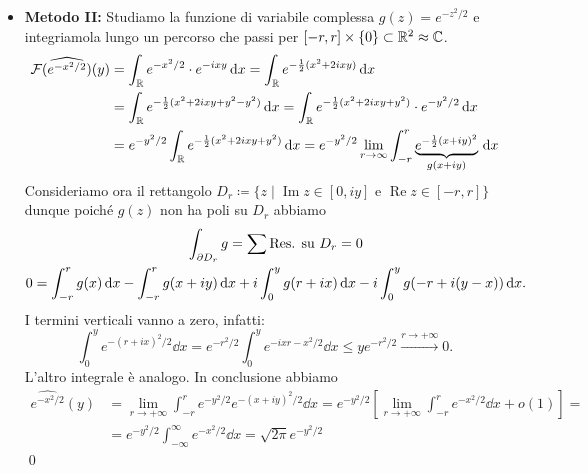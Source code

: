 \begin{itemize}
	\item \textbf{Metodo II:} Studiamo la funzione di variabile complessa $g(z) = e^{-z^2/2}$ e integriamola lungo un percorso che passi per $[-r, r] \times \{ 0 \} \subset \mathbb R^2 \approx \mathbb C$.
		$$
		\begin{aligned}
			\mathcal F(\widehat{e^{-x^2/2}})(y) 
			&= \int_\mathbb R e^{-x^2 / 2} \cdot e^{-ixy} \,\mathrm{d} x
			= \int_\mathbb R e^{-\frac{1}{2}(x^2 + 2ixy)} \,\mathrm{d} x \\
			&= \int_\mathbb R e^{-\frac{1}{2}(x^2 + 2ixy + y^2 - y^2)} \,\mathrm{d} x 
			= \int_\mathbb R e^{-\frac{1}{2}(x^2 + 2ixy + y^2)} \cdot e^{-y^2 / 2} \,\mathrm{d} x \\
			&= e^{-y^2 / 2} \int_\mathbb R e^{-\frac{1}{2}(x^2 + 2ixy + y^2)} \,\mathrm{d} x 
			= e^{-y^2 / 2} \lim_{r \to \infty} \int_{-r}^r \underbrace{e^{-\frac{1}{2}(x + iy)^2}}_{g(x + iy)} \,\mathrm{d} x
		\end{aligned}
		$$
		Consideriamo ora il rettangolo $D_r \coloneqq \{ z \mid \operatorname{Im} z \in [0, iy] \text{ e } \operatorname{Re} z \in [-r, r] \}$ dunque poiché $g(z)$ non ha poli su $D_r$ abbiamo
		$$
		\begin{gathered}
			\int_{\partial D_r} g = \sum \text{Res. su $D_r$} = 0 \\
			0 = \int_{-r}^r g(x) \,\mathrm{d} x - \int_{-r}^r g(x + iy) \,\mathrm{d} x 
			+ i \int_{0}^{y} g(r + ix) \,\mathrm{d} x - i\int_{0}^{y} g(-r + i(y-x)) \,\mathrm{d} x.
		\end{gathered}
		$$
		I termini verticali vanno a zero, infatti:
		$$
			\int_0^y e^{-(r+ix)^2 / 2} \dd x
			= e^{-r^2 / 2} \int_0^y e^{-ixr - x^2/2} \dd x \leq y e^{-r^2 / 2} \xrightarrow{r \to +\infty} 0.
		$$
		L'altro integrale è analogo. In conclusione abbiamo
		$$
		\begin{aligned}
			\hat{e^{-x^2 / 2}} (y) 
			&= \lim_{r \to +\infty} \int_{-r}^r e^{-y^2 / 2} e^{-(x + iy)^2 / 2} \dd x 
			= e^{-y^2 / 2} \left[ \lim_{r \to +\infty} \int_{-r}^r e^{-x^2 / 2} \dd x + o(1) \right] = \\
			&= e^{-y^2 / 2} \int_{-\infty}^\infty e^{-x^2 / 2} \dd x = \sqrt{2\pi} e^{-y^2 / 2} 
		\end{aligned}
		$$
		\qed

\end{itemize}



